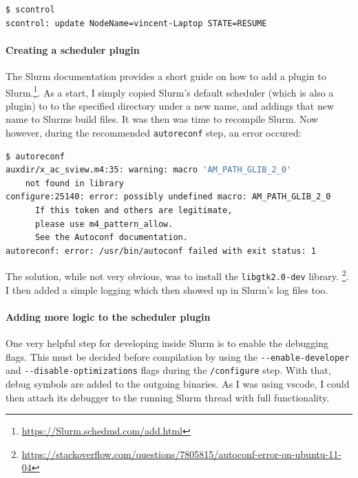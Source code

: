 \begin{lstlisting}[language=bash, frame=single, numbers=none, caption={Slurm running}, basicstyle=\ttfamily]
$ scontrol
scontrol: update NodeName=vincent-Laptop STATE=RESUME
\end{lstlisting}

\paragraph{Creating a scheduler plugin}

The Slurm documentation provides a short guide on how to add a plugin to Slurm.\footnote{\url{https://Slurm.schedmd.com/add.html}}. 
As a start, I simply copied Slurm's default scheduler (which is also a plugin) to to the specified directory under a new name, and addings that new name to Slurms build files. 
It was then was time to recompile Slurm. 
Now however, during the recommended \verb|autoreconf| step, an error occured:

\begin{lstlisting}[language=bash, frame=single, numbers=none, caption={Plugin recompilation errors}, basicstyle=\ttfamily]
$ autoreconf
auxdir/x_ac_sview.m4:35: warning: macro 'AM_PATH_GLIB_2_0' 
    not found in library
configure:25140: error: possibly undefined macro: AM_PATH_GLIB_2_0
      If this token and others are legitimate, 
      please use m4_pattern_allow.
      See the Autoconf documentation.
autoreconf: error: /usr/bin/autoconf failed with exit status: 1
\end{lstlisting}

The solution, while not very obvious, was to install the \verb|libgtk2.0-dev| library. \footnote{\url{https://stackoverflow.com/questions/7805815/autoconf-error-on-ubuntu-11-04}}. 
I then added a simple logging which then showed up in Slurm's log files too.

\paragraph{Adding more logic to the scheduler plugin}

One very helpful step for developing inside Slurm is to enable the debugging flags.
This must be decided before compilation by using the \verb|--enable-developer| and \verb|--disable-optimizations| flags during the \verb|/configure| step. 
With that, debug symbols are added to the outgoing binaries. 
As I was using vscode, I could then attach its debugger to the running Slurm thread with full functionality.

